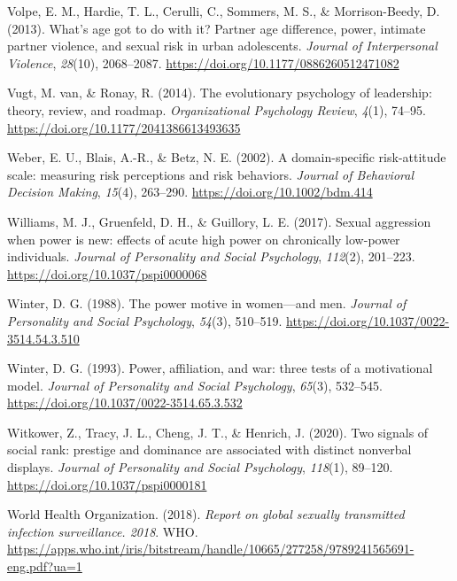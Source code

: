 \documentclass[
  donotrepeattitle,doc, 12pt, a4paper,floatsintext]{apa7}
\newlength{\cslhangindent}
\newlength{\cslentryspacingunit} %
\newenvironment{CSLReferences}[2] %
 {%
  \setlength{\parindent}{0pt}
  \ifodd #1
  \let\oldpar\par
  \def\par{\hangindent=\cslhangindent\oldpar}
  \fi
  \setlength{\parskip}{#2\cslentryspacingunit}
 }%
 {}
\begin{document}
\begin{CSLReferences}{1}{0}
\leavevmode{}%
Volpe, E. M., Hardie, T. L., Cerulli, C., Sommers, M. S., \& Morrison-Beedy, D. (2013). What's age got to do with it? Partner age difference, power, intimate partner violence, and sexual risk in urban adolescents. \emph{Journal of Interpersonal Violence}, \emph{28}(10), 2068--2087. \url{https://doi.org/10.1177/0886260512471082}

\leavevmode{}%
Vugt, M. van, \& Ronay, R. (2014). The evolutionary psychology of leadership: theory, review, and roadmap. \emph{Organizational Psychology Review}, \emph{4}(1), 74--95. \url{https://doi.org/10.1177/2041386613493635}

\leavevmode{}%
Weber, E. U., Blais, A.-R., \& Betz, N. E. (2002). A domain-specific risk-attitude scale: measuring risk perceptions and risk behaviors. \emph{Journal of Behavioral Decision Making}, \emph{15}(4), 263--290. \url{https://doi.org/10.1002/bdm.414}

\leavevmode{}%
Williams, M. J., Gruenfeld, D. H., \& Guillory, L. E. (2017). Sexual aggression when power is new: effects of acute high power on chronically low-power individuals. \emph{Journal of Personality and Social Psychology}, \emph{112}(2), 201--223. \url{https://doi.org/10.1037/pspi0000068}

\leavevmode{}%
Winter, D. G. (1988). The power motive in women---and men. \emph{Journal of Personality and Social Psychology}, \emph{54}(3), 510--519. \url{https://doi.org/10.1037/0022-3514.54.3.510}

\leavevmode{}%
Winter, D. G. (1993). Power, affiliation, and war: three tests of a motivational model. \emph{Journal of Personality and Social Psychology}, \emph{65}(3), 532--545. \url{https://doi.org/10.1037/0022-3514.65.3.532}

\leavevmode{}%
Witkower, Z., Tracy, J. L., Cheng, J. T., \& Henrich, J. (2020). Two signals of social rank: prestige and dominance are associated with distinct nonverbal displays. \emph{Journal of Personality and Social Psychology}, \emph{118}(1), 89--120. \url{https://doi.org/10.1037/pspi0000181}

\leavevmode{}%
World Health Organization. (2018). \emph{Report on global sexually transmitted infection surveillance. 2018}. WHO. \url{https://apps.who.int/iris/bitstream/handle/10665/277258/9789241565691-eng.pdf?ua=1}


\end{CSLReferences}
\end{document}
